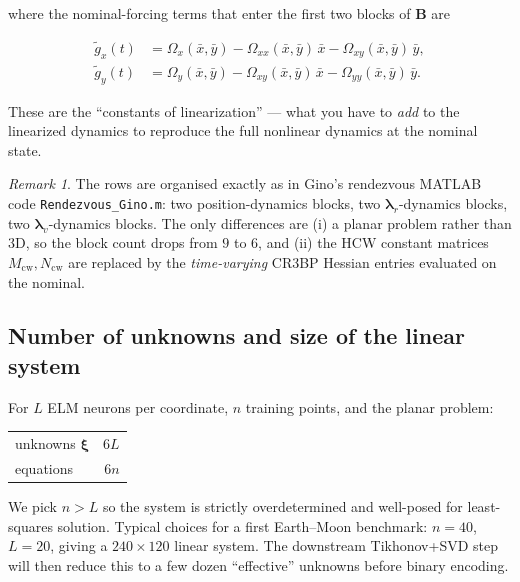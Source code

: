 \documentclass[8pt,a4paper]{article}
\newcommand{\bvec}[1]{\bm{#1}}
\newcommand{\lamr}{\bvec{\lambda}_r}
\newcommand{\lamv}{\bvec{\lambda}_v}
\newcommand{\Omegax}{\Omega_x}
\newcommand{\Omegay}{\Omega_y}
\newcommand{\Omegaxx}{\Omega_{xx}}
\newcommand{\Omegayy}{\Omega_{yy}}
\newcommand{\Omegaxy}{\Omega_{xy}}
\newcommand{\Bmat}{\bvec{B}}
\theoremstyle{definition}
\theoremstyle{remark}
\newtheorem*{remark}{Remark}
\begin{document}
where the nominal-forcing terms that enter the first two blocks of
$\Bmat$ are

\begin{align}
  \tilde g_x(t) &= \Omegax(\bar x, \bar y)
                 - \Omegaxx(\bar x, \bar y)\,\bar x
                 - \Omegaxy(\bar x, \bar y)\,\bar y, \\
  \tilde g_y(t) &= \Omegay(\bar x, \bar y)
                 - \Omegaxy(\bar x, \bar y)\,\bar x
                 - \Omegayy(\bar x, \bar y)\,\bar y.
\end{align}

These are the ``constants of linearization'' --- what you have to
\emph{add} to the linearized dynamics to reproduce the full nonlinear
dynamics at the nominal state.

\begin{remark}
The rows are organised exactly as in Gino's rendezvous MATLAB code
\texttt{Rendezvous\_Gino.m}: two position-dynamics blocks, two
$\lamr$-dynamics blocks, two $\lamv$-dynamics blocks. The only
differences are (i) a planar problem rather than 3D, so the
block count drops from $9$ to $6$, and (ii) the HCW constant
matrices $M_{\mathrm{cw}}, N_{\mathrm{cw}}$ are replaced by the
\emph{time-varying} CR3BP Hessian entries evaluated on the nominal.
\end{remark}

\subsection{Number of unknowns and size of the linear system}

For $L$ ELM neurons per coordinate, $n$ training points, and the
planar problem:

\begin{center}
\begin{tabular}{lr}
  \toprule
  unknowns $\bm\xi$ & $6L$ \\
  equations         & $6n$ \\
  \bottomrule
\end{tabular}
\end{center}

We pick $n > L$ so the system is strictly overdetermined and
well-posed for least-squares solution. Typical choices for a first
Earth--Moon benchmark: $n = 40$, $L = 20$, giving a
$240\times 120$ linear system. The downstream Tikhonov+SVD step will
then reduce this to a few dozen ``effective'' unknowns before binary
encoding.


\end{document}
